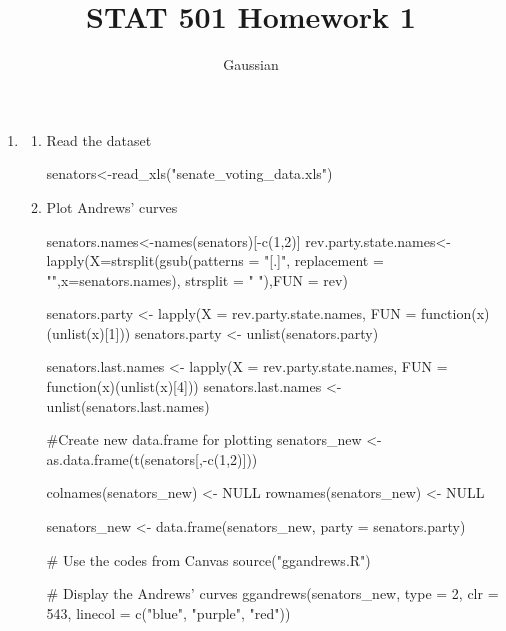 \documentclass{article}
\begin{document}
	

	
	\title{STAT 501 Homework 1}
	\author{Gaussian}
	\maketitle
	
	\begin{enumerate}[leftmargin = 0 em, label = \arabic*., font = \bfseries]
	\item 
	\begin{enumerate}
		\item 
		Read the dataset
		\begin{rcode}
senators<-read_xls("senate_voting_data.xls")		
		\end{rcode}

		\item 
		Plot Andrews' curves
		\begin{rcode}
senators.names<-names(senators)[-c(1,2)]
rev.party.state.names<-lapply(X=strsplit(gsub(patterns = "[.]", replacement = "",x=senators.names), strsplit = " "),FUN = rev)

senators.party <- lapply(X = rev.party.state.names, FUN = function(x)(unlist(x)[1]))
senators.party <- unlist(senators.party)

senators.last.names <- lapply(X = rev.party.state.names, FUN = function(x)(unlist(x)[4]))
senators.last.names <- unlist(senators.last.names)


#Create new data.frame for plotting
senators_new <- as.data.frame(t(senators[,-c(1,2)]))

colnames(senators_new) <- NULL
rownames(senators_new) <- NULL

senators_new <- data.frame(senators_new, party = senators.party)

# Use the codes from Canvas
source("ggandrews.R")

# Display the Andrews' curves
ggandrews(senators_new, type = 2, clr = 543, linecol = c("blue", "purple", "red"))		
		\end{rcode}


\end{enumerate}
\end{enumerate}
\end{document}
